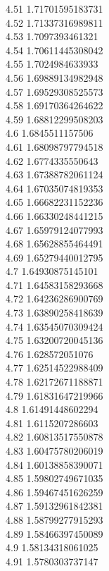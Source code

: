 {4.51	1.71701595183731\\
4.52	1.71337316989811\\
4.53	1.7097393461321\\
4.54	1.70611445308042\\
4.55	1.7024984633933\\
4.56	1.69889134982948\\
4.57	1.69529308525573\\
4.58	1.69170364264622\\
4.59	1.68812299508203\\
4.6	1.6845511157506\\
4.61	1.68098797794518\\
4.62	1.6774335550643\\
4.63	1.67388782061124\\
4.64	1.67035074819353\\
4.65	1.66682231152236\\
4.66	1.66330248441215\\
4.67	1.65979124077993\\
4.68	1.65628855464491\\
4.69	1.65279440012795\\
4.7	1.64930875145101\\
4.71	1.64583158293668\\
4.72	1.64236286900769\\
4.73	1.63890258418639\\
4.74	1.63545070309424\\
4.75	1.63200720045136\\
4.76	1.628572051076\\
4.77	1.62514522988409\\
4.78	1.62172671188871\\
4.79	1.61831647219966\\
4.8	1.61491448602294\\
4.81	1.6115207286603\\
4.82	1.60813517550878\\
4.83	1.60475780206019\\
4.84	1.60138858390071\\
4.85	1.59802749671035\\
4.86	1.59467451626259\\
4.87	1.59132961842381\\
4.88	1.58799277915293\\
4.89	1.58466397450089\\
4.9	1.58134318061025\\
4.91	1.5780303737147\\
}
